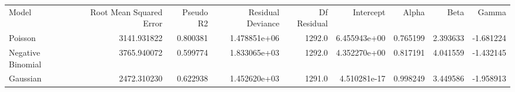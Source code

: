 \begin{tabular}{lrrrrrrrr}
\toprule
             Model &  Root Mean Squared Error &  Pseudo R2 &  Residual Deviance &  Df Residual &     Intercept &     Alpha &      Beta &     Gamma \\
           Poisson &              3141.931822 &   0.800381 &       1.478851e+06 &       1292.0 &  6.455943e+00 &  0.765199 &  2.393633 & -1.681224 \\
\midrule
 Negative Binomial &              3765.940072 &   0.599774 &       1.833065e+03 &       1292.0 &  4.352270e+00 &  0.817191 &  4.041559 & -1.432145 \\
          Gaussian &              2472.310230 &   0.622938 &       1.452620e+03 &       1291.0 &  4.510281e-17 &  0.998249 &  3.449586 & -1.958913 \\
\bottomrule
\end{tabular}

